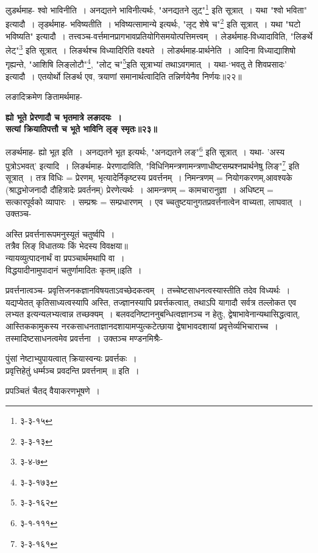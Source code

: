 {{{ लुडर्थमाह- श्वो भाविनीति~।
अनद्यतने भाविनीत्यर्थः, "अनद्यतने लुट्"\footnote{३-३-१५} इति सूत्रात्~।
यथा "श्वो भविता" इत्यादौ~।
 लृडर्थमाह- भविष्यतीति~।
भविष्यत्सामान्ये इत्यर्थः, "लृट् शेषे च"\footnote{३-३-१३} इति सूत्रात्~।
यथा "घटो भविष्यति" इत्यादौ~।
तत्त्वञ्च-वर्त्तमानप्रागभावप्रतियोगिसमयोत्पत्तिमत्त्वम्~।
 लेडर्थमाह-विध्यादाविति, "लिङर्थे लेट्"\footnote{३-४-७} इति सूत्रात्~।
लिङर्थश्च विध्यादिरिति वक्ष्यते~।
 लोडर्थमाह-प्रार्थनेति~।
आदिना विध्याद्याशिषो गृह्यन्ते, "आशिषि लिङ्लोटौ"\footnote{३-३-१७३}, "लोट् च"\footnote{३-३-१६२}इति सूत्राभ्यां तथाऽवगमात्~।
यथा-`भवतु ते शिवप्रसादः' इत्यादौ~।
एतयोर्थो लिङर्थ एव, त्रयाणां समानार्थत्वादिति तन्निर्णयेनैव निर्णयः॥२२॥\par
लङादिक्रमेण ङितामर्थमाह-
\begin{center}{\bfseries ह्यो भूते प्रेरणादौ च भृतमात्रे लङादयः~।\\
 सत्यां क्रियातिपत्तौ च भूते भाविनि लृङ् स्मृतः॥२३॥}
\end{center}
 लङर्थमाह- ह्यो भूत इति~।
अनद्यतने भूत इत्यर्थः, "अनद्यतने लङ्"\footnote{३-१-१११} इति सूत्रात्~।
यथा- 'अस्य पुत्रोऽभवत्' इत्यादि~।
 लिङर्थमाह- प्रेरणादाविति, "विधिनिमन्त्रणामन्त्रणाधीष्टसम्प्रश्नप्रार्थनेषु लिङ्"\footnote{३-३-१६१} इति सूत्रात्~।
तत्र विधिः = प्रेरणम्, भृत्यादेर्निकृष्टस्य प्रवर्त्तनम्~।
निमन्त्रणम् = नियोगकरणम्,आवश्यके (श्राद्धभोजनादौ दौहित्रादेः प्रवर्तनम्) प्रेरणेत्यर्थः~।
आमन्त्रणम् = कामचारानुज्ञा~।
अधिष्टम् = सत्कारपूर्वको व्यापारः~।
सम्प्रश्रः = सम्प्रधारणम्~।
 एव च्चतुष्टयानुगतप्रवर्त्तनात्वेन वाच्यता, लाघवात्~।
उक्तञ्च-
\begin{center} अस्ति प्रवर्त्तनारूपमनुस्यूतं चतुर्ष्वपि~।\\
 तत्रैव लिङ् विधातव्यः किं भेदस्य विवक्षया॥\\[10pt]
 न्यायव्युत्पादनार्थं वा प्रपञ्चार्थमथापि वा~।\\
 विद्धयादीनामुपादानं चतुर्णामादितः कृतम्॥इति~।\\
 \end{center}
प्रवर्त्तनात्वञ्च- प्रवृत्तिजनकज्ञानविषयताऽवच्छेदकत्वम्~।
तच्चेष्टसाधनत्वस्यास्तीति तदेव विध्यर्थः~।
यद्यप्येतत् कृतिसाध्यत्वस्यापि अस्ति, तज्ज्ञानस्यापि प्रवर्त्तकत्वात्, तथाऽपि यागादौ सर्वत्र तल्लोकत एव लभ्यत इत्यन्यलभ्यत्वान्न तच्छक्यम्~।
बलवदनिष्टाननुबन्धित्वज्ञानञ्च न हेतुः, द्वेषाभावेनान्यथासिद्धत्वात्, आस्तिककामुकस्य नरकसाधनताज्ञानदशायामप्युत्कटेत्छाया द्वेषाभावदशायां प्रवृत्तेर्व्यभिचाराच्च~।
तस्मादिष्टसाधनत्वमेव प्रवर्त्तना~।
उक्तञ्च मण्डनमिश्रैः-
\begin{center} पुंसां नेष्टाभ्युपायत्वात् क्रियास्वन्यः प्रवर्त्तकः~।\\
 प्रवृत्तिहेतुं धर्म्मञ्च प्रवदन्ति प्रवर्त्तनाम् ॥ इति~।
\end{center}
प्रपञ्चितं चैतद् वैयाकरणभूषणे~।

}}}
